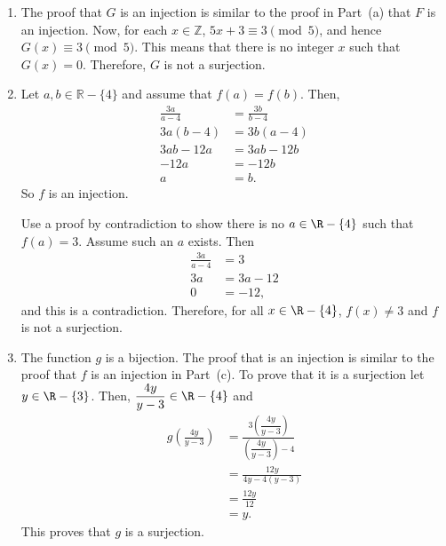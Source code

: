 \begin{enumerate}
\begin{enumerate}
\item The proof that $G$ is an injection is similar to the proof in Part~(a) that $F$ is an injection.  Now, for each $x \in \mathbb{Z}$, $5x + 3 \equiv 3 \pmod 5$, and hence 
$G ( x ) \equiv 3 \pmod 5$.  This means that there is no integer $x$ such that 
$G ( x ) = 0$.  Therefore, $G$ is not a surjection.

\item Let  $a, b \in \mathbb{R} - \{4 \}$ and assume that 
$f( a ) = f( b )$.  Then,
\begin{align*}
\frac{3a}{a - 4} &= \frac{3b}{b - 4} \\
       3a(b - 4) &= 3b(a - 4) \\
       3ab - 12a &= 3ab - 12b \\
            -12a &= -12b \\
               a &= b.
\end{align*}
So $f$ is an injection.

Use a proof by contradiction to show there is no $a \in \R - \{4 \}$ such that $f(a) = 3$.  Assume such an $a$ exists.  Then
\begin{align*}
\frac{3a}{a - 4} &= 3 \\
3a &= 3a - 12 \\
 0 &= - 12,
\end{align*}
and this is a contradiction.  Therefore, for all $x \in \R - \{4\}$, $f(x) \ne 3$ and $f$ is not a surjection.

\item The function $g$ is a bijection.  The proof that is an injection is similar to the proof that $f$ is an injection in Part~(c).  To prove that it is a surjection let 
$y \in \R - \{3 \}$.  Then, $\dfrac{4y}{y - 3} \in \R - \{4\}$ and
\begin{align*}
g \left(\frac{4y}{y - 3}\right) &= \frac{3 \left(\dfrac{4y}{y - 3}\right)}{\left(\dfrac{4y}{y - 3}\right) - 4} \\
   &= \frac{12y}{4y - 4(y - 3)} \\
   &= \frac{12y}{12} \\
   &= y.
\end{align*}
This proves that $g$ is a surjection.
\end{enumerate}



%


\end{enumerate}
